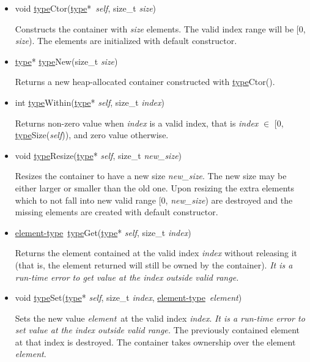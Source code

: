 \documentclass[a4paper]{article}
\newcommand{\st}{\underline{type}}
\newcommand{\et}{\underline{element-type}}
\newcommand{\sv}{\emph{self}}
\newcommand{\ev}{\emph{element}}
\newcommand{\meth}[1]{#1}
\begin{document}
\begin{itemize}


\item \meth{void \st Ctor(\st*\ \sv, size\_t \emph{size})}


Constructs the container with \emph{size} elements.
The valid index range will be [0, \emph{size}).
The elements are initialized with default constructor.


\item \meth{\st* \st New(size\_t \emph{size})}


Returns a new heap-allocated container constructed with \meth{\st Ctor()}.


\commonmethods


\item \meth{int \st Within(\st* \sv, size\_t \emph{index})}


Returns non-zero value when \emph{index} is a valid index, that is \emph{index} $\in$ [0, \meth{\st Size(\sv)}), and zero value otherwise.


\item \meth{void \st Resize(\st* \sv, size\_t \emph{new\_size})}


Resizes the container to have a new size \emph{new\_size}.
The new size may be either larger or smaller than the old one.
Upon resizing the extra elements which to not fall into new valid range [0, \emph{new\_size}) are destroyed and the missing elements are created with default constructor.


\item \meth{\et\ \st Get(\st* \sv, size\_t \emph{index})}


Returns the element contained at the valid index \emph{index} without releasing it (that is, the element returned will still be owned by the container).
\emph{It is a run-time error to get value at the index outside valid range.}


\item \meth{void \st Set(\st* \sv, size\_t \emph{index}, \et\ \ev)}


Sets the new value \ev\ at the valid index \emph{index}.
\emph{It is a run-time error to set value at the index outside valid range.}
The previously contained element at that index is destroyed.
The container takes ownership over the element \ev.


\end{itemize}



\end{document}
